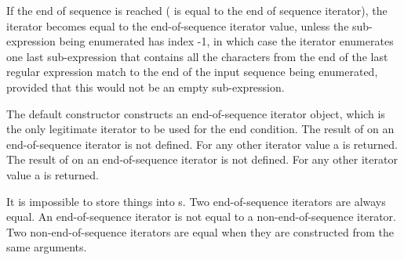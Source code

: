 \pnum
If the end of sequence is reached ( is equal to the end of
sequence iterator), the iterator becomes equal to the end-of-sequence
iterator value, unless the sub-expression being enumerated has index -1,
in which case the iterator enumerates one last sub-expression that contains
all the characters from the end of the last regular expression match to the
end of the input sequence being enumerated, provided that this would not be an
empty sub-expression.

\pnum
{}%
The default constructor constructs
an end-of-sequence iterator object, which is the only legitimate
iterator to be used for the end condition. The result of  on
an end-of-sequence iterator is not defined. For any other iterator value a
 is returned.
The result of  on an end-of-sequence iterator
is not defined. For any other iterator value a  is returned.

\pnum
{}%
It is impossible to store things
into s. Two end-of-sequence iterators are always
equal. An end-of-sequence iterator is not equal to a
non-end-of-sequence iterator. Two non-end-of-sequence iterators are
equal when they are constructed from the same arguments.

